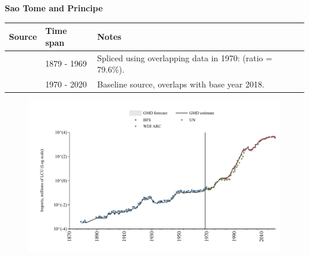 \documentclass[12pt,a4paper,landscape]{article}
\begin{document}
\begin{adjustbox}{max totalsize={\paperwidth}{\paperheight},center}
\begin{minipage}[t][\textheight][t]{\textwidth}
\vspace*{0.5cm}
{}
\begin{center}
{\Large\bfseries Sao Tome and Principe}
\end{center}
\vspace{0.5cm}
\begin{table}[H]
\centering
\small
\begin{tabular}{|l|l|l|}
\hline
\textbf{Source} & \textbf{Time span} & \textbf{Notes} \\
\hline
\rowcolor{white}\cite{HFS}& 1879 - 1969 &Spliced using overlapping data in 1970: (ratio = 79.6\%).\\
\rowcolor{lightgray}\cite{UN}& 1970 - 2020 &Baseline source, overlaps with base year 2018.\\
\hline
\end{tabular}
\end{table}
\begin{figure}[H]
\centering
\includegraphics[width=\textwidth,height=0.6\textheight,keepaspectratio]{graphs/STP_imports.pdf}
\end{figure}
\end{minipage}
\end{adjustbox}
\end{document}
